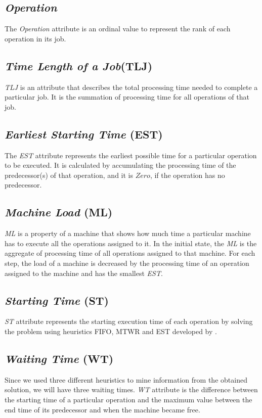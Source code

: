 \documentclass[runningheads]{llncs}
\begin{document}
\subsection{\textit{Operation}}
The \textit{Operation} attribute is an ordinal value to represent the rank of each operation in its job.

\subsection{\textit{Time Length of a Job}(TLJ)}
\textit{TLJ} is an attribute that describes the total processing time needed to complete a particular job. It is the summation of processing time for all operations of that job.

\subsection{\textit{Earliest Starting Time} (EST)}
The \textit{EST} attribute represents the earliest possible time for a particular operation to be executed. It is calculated by accumulating the processing time of the predecessor(s) of that operation, and it is $Zero$, if the operation has no predecessor.

\subsection{\textit{Machine Load} (ML)}
\textit{ML} is a property of a machine that shows how much time a particular machine has to execute all the operations assigned to it. In the initial state, the \textit{ML} is the aggregate of processing time of all operations assigned to that machine. For each step, the load of a machine is decreased by the processing time of an operation assigned to the machine and has the smallest \textit{EST}.

\subsection{\textit{Starting Time} (ST)}
\textit{ST} attribute represents the starting execution time of each operation by solving the problem using heuristics FIFO, MTWR and EST developed by \cite{tassel2021reinforcement,el2020job}.

\subsection{\textit{Waiting Time} (WT)}
Since we used three different heuristics to mine information from the obtained solution, we will have three waiting times. \textit{WT} attribute is the difference between the starting time of a particular operation and the maximum value between the end time of its predecessor and when the machine became free.
\end{document}
